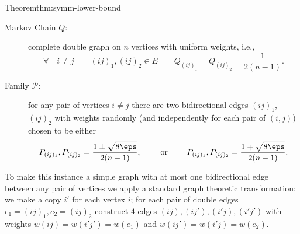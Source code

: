 \begin{prevproof}{Theorem}{thm:symm-lower-bound}
\begin{description}
	\item[Markov Chain $Q$:] complete double graph on $n$ vertices with uniform weights, i.e., 
	\[
	\forall \quad i\neq j \quad\quad (ij)_1, (ij)_2\in E  \quad\quad  Q_{(ij)_1}=Q_{(ij)_2}=\frac{1}{2(n-1)}.
	\]
	\item[Family $\mathcal{P}$:] for any pair of vertices $i\neq j$ there are two bidirectional edges $(ij)_1$, $(ij)_2$
	with weights randomly (and independently for each pair of $(i,j)$) chosen to be either
	\[
	P_{(ij)_1}, P_{(ij)_2}=\frac{1\pm \sqrt{8\eps}}{2(n-1)},
	\quad\quad\text{ or }\quad\quad
	P_{(ij)_1},P_{(ij)_2}=\frac{1\mp \sqrt{8\eps}}{2(n-1)}.
	\]
\end{description}
To make this instance a simple graph with at most one bidirectional edge between any pair of vertices we apply 
a standard graph theoretic transformation: we make a copy $i'$ for each vertex $i$; for each pair of double edges 
$e_1=(ij)_1, e_2=(ij)_2$ construct $4$ edges $(ij),(ij'),(i'j),(i'j')$ with weights $w(ij)=w(i'j')=w(e_1)$ and $w(ij')=w(i'j)=w(e_2)$. 

\end{prevproof}
